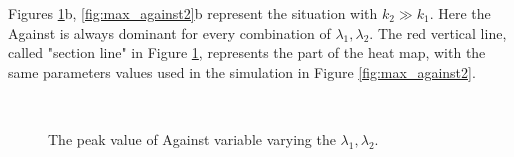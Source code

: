 Figures \ref{fig:max_against}b, \ref{fig:max_against2}b represent the situation with $k_2 \gg k_1$. Here the Against is always dominant for every combination of $\lambda_1, \lambda_2$.
The red vertical line, called "section line" in Figure \ref{fig:max_against}, represents the part of the heat map, with the same parameters values used in the simulation in Figure \ref{fig:max_against2}.

\begin{figure}
	\centering
	 \quad
	 \\
	\caption[Maximum Against]{ The peak value of Against variable varying the $\lambda_1, \lambda_2$.}
	\label{fig:max_against}
\end{figure}

